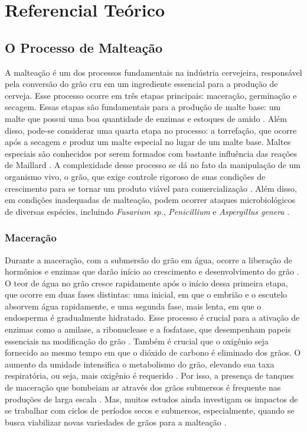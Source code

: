 \chapter[Referencial Teórico]{Referencial Teórico}

\section{O Processo de Malteação}

A malteação é um dos processos fundamentais na indústria cervejeira, responsável pela conversão do grão cru em um ingrediente essencial para a produção de cerveja. Esse processo ocorre em três etapas principais: maceração, germinação e secagem. Essas etapas são fundamentais para a produção de malte base: um malte que possui uma boa quantidade de enzimas e estoques de amido \cite{BRIGGS2004,CENCI2021}. Além disso, pode-se considerar uma quarta etapa no processo: a torrefação, que ocorre após a secagem e produz um malte especial no lugar de um malte base. Maltes especiais são conhecidos por serem formados com bastante influência das reações de Maillard \cite{COGHE2004}. A complexidade desse processo se dá no fato da manipulação de um organismo vivo, o grão, que exige controle rigoroso de suas condições de crescimento para se tornar um produto viável para comercialização \cite{MALLETT2022}. Além disso, em condições inadequadas de malteação, podem ocorrer ataques microbiológicos de diversas espécies, incluindo \textit{Fusarium sp.}, \textit{Penicillium} e \textit{Aspergillus genera} \cite{LUARASI2016}.

\subsection{Maceração}

Durante a maceração, com a submersão do grão em água, ocorre a liberação de hormônios e enzimas que darão início ao crescimento e desenvolvimento do grão \cite{LEWIS2012}. O teor de água no grão cresce rapidamente após o início dessa primeira etapa, que ocorre em duas fases distintas: uma inicial, em que o embrião e o escutelo absorvem água rapidamente, e uma segunda fase, mais lenta, em que o endosperma é gradualmente hidratado. Esse processo é crucial para a ativação de enzimas como a amilase, a ribonuclease e a fosfatase, que desempenham papeis essenciais na modificação do grão \cite{REYNOLDS1966}. Também é crucial que o oxigênio seja fornecido ao mesmo tempo em que o dióxido de carbono é eliminado dos grãos. O aumento da umidade intensifica o metabolismo do grão, elevando sua taxa respiratória, ou seja, mais oxigênio é requerido \cite{KUNZE1996}. Por isso, a presença de tanques de maceração que bombeiam ar através dos grãos submersos é frequente nas produções de larga escala \cite{CENCI2021}. Mas, muitos estudos ainda investigam os impactos de se trabalhar com ciclos de períodos secos e submersos, especialmente, quando se busca viabilizar novas variedades de grãos para a malteação \cite{MAYER2014,TURNER2019}.

